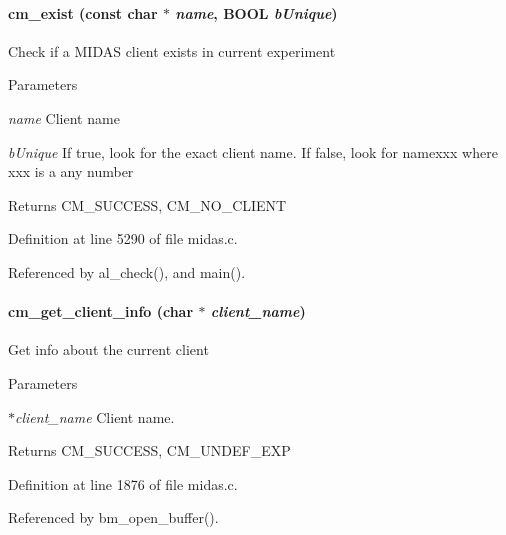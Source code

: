 \paragraph[{cm\_\-exist}]{ cm\_\-exist (const char $\ast$ {\em name}, \/  {\bf BOOL} {\em bUnique})}\hfill\label{group__cmfunctionc_gafb034d850f13190ba256f235fcea5298}
Check if a MIDAS client exists in current experiment 
\begin{DoxyParams}{Parameters}
\item[{\em name}]Client name \item[{\em bUnique}]If true, look for the exact client name. If false, look for namexxx where xxx is a any number \end{DoxyParams}
\begin{DoxyReturn}{Returns}
CM\_\-SUCCESS, CM\_\-NO\_\-CLIENT 
\end{DoxyReturn}


Definition at line 5290 of file midas.c.

Referenced by al\_\-check(), and main().
\paragraph[{cm\_\-get\_\-client\_\-info}]{ cm\_\-get\_\-client\_\-info (char $\ast$ {\em client\_\-name})}\hfill\label{group__cmfunctionc_ga0aa3002f758a710360b90a50500fc784}
Get info about the current client 
\begin{DoxyParams}{Parameters}
\item[{\em $\ast$client\_\-name}]Client name. \end{DoxyParams}
\begin{DoxyReturn}{Returns}
CM\_\-SUCCESS, CM\_\-UNDEF\_\-EXP 
\end{DoxyReturn}


Definition at line 1876 of file midas.c.

Referenced by bm\_\-open\_\-buffer().
